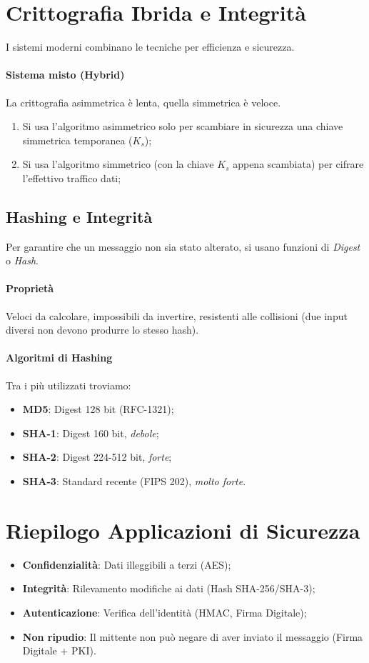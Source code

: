 %
\section{Crittografia Ibrida e Integrità}
I sistemi moderni combinano le tecniche per efficienza e sicurezza.
%
\paragraph{Sistema misto (Hybrid)} La crittografia asimmetrica è lenta, quella simmetrica è veloce.
\begin{enumerate}
    \item Si usa l'algoritmo asimmetrico solo per scambiare in sicurezza una chiave simmetrica temporanea ($K_s$);
    \item Si usa l'algoritmo simmetrico (con la chiave $K_s$ appena scambiata) per cifrare l'effettivo traffico dati;
\end{enumerate}

%
\subsection{Hashing e Integrità} Per garantire che un messaggio non sia stato alterato, si usano funzioni di \emph{Digest} o \emph{Hash}.
%
\paragraph{Proprietà} Veloci da calcolare, impossibili da invertire, resistenti alle collisioni (due input diversi non devono produrre lo stesso hash).
%
\paragraph{Algoritmi di Hashing}
Tra i più utilizzati troviamo:
\begin{itemize}
    \item \textbf{MD5}: Digest 128 bit (RFC-1321);
    \item \textbf{SHA-1}: Digest 160 bit, \emph{debole};
    \item \textbf{SHA-2}: Digest 224-512 bit, \emph{forte};
    \item \textbf{SHA-3}: Standard recente (FIPS 202), \emph{molto forte}.
\end{itemize}

%
\section{Riepilogo Applicazioni di Sicurezza}
\begin{itemize}
    \item \textbf{Confidenzialità}: Dati illeggibili a terzi (AES);
    \item \textbf{Integrità}: Rilevamento modifiche ai dati (Hash SHA-256/SHA-3);
    \item \textbf{Autenticazione}: Verifica dell'identità (HMAC, Firma Digitale);
    \item \textbf{Non ripudio}: Il mittente non può negare di aver inviato il messaggio (Firma Digitale + PKI).
\end{itemize}